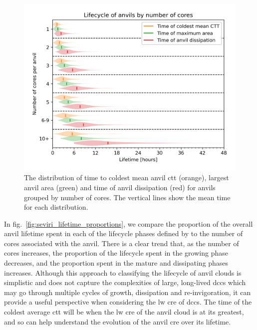 \begin{figure}[tp]
    \includegraphics[width=\textwidth]{figures/chapter4_11.png}
    \caption[
    The distribution of time to coldest mean anvil \acrshort{ctt}, largest anvil area and time of anvil dissipation
    ]{
    The distribution of time to coldest mean anvil \acrshort{ctt} (orange), largest anvil area (green) and time of anvil dissipation (red) for anvils grouped by number of cores. The vertical lines show the mean time for each distribution.
    }
    \label{fig:seviri_lifetime_dists}
\end{figure}


In fig.~\ref{fig:seviri_lifetime_proportions}, we compare the proportion of the overall anvil lifetime spent in each of the lifecycle phases defined by \citet{futyan_deep_2007} to the number of cores associated with the anvil. 
There is a clear trend that, as the number of cores increases, the proportion of the lifecycle spent in the growing phase decreases, and the proportion spent in the mature and dissipating phases increases.
 Although this approach to classifying the lifecycle of anvil clouds is simplistic and does not capture the complexities of large, long-lived \acrshort{dcc}s which may go through multiple cycles of growth, dissipation and re-invigoration, it can provide a useful perspective when considering the \acrshort{lw} \acrshort{cre} of \acrshort{dcc}s. 
 The time of the coldest average \acrshort{ctt} will be when the \acrshort{lw} \acrshort{cre} of the anvil cloud is at its greatest, and so can help understand the evolution of the anvil \acrshort{cre} over its lifetime.


